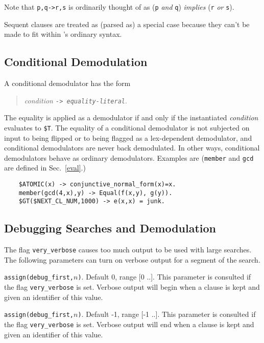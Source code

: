 \documentclass[11pt]{article}
\begin{document}
Note that \verb:p,q->r,s: is ordinarily thought of as
(\verb:p: {\em and} \verb:q:) {\em implies} 
(\verb:r: {\em or} \verb:s:).

Sequent clauses are treated as (parsed as) a special case because
they can't be made to fit within \otter's ordinary syntax.

\subsection{Conditional Demodulation} \label{cond-demod}

A conditional demodulator has the form
\begin{verse}
{\it condition \tt -> \it equality-literal}.
\end{verse}
The equality is applied as a demodulator if and only if the
instantiated {\it condition} evaluates to \verb:$T:.
The equality of
a conditional demodulator is not subjected on input to being flipped or
to being flagged as a lex-dependent demodulator, and conditional
demodulators are never back demodulated.  In other ways, conditional
demodulators behave as ordinary demodulators.  Examples are
(\verb:member: and \verb:gcd: are defined in Sec.~\ref{eval}.)

{\small
\begin{verbatim}
    $ATOMIC(x) -> conjunctive_normal_form(x)=x.
    member(gcd(4,x),y) -> Equal(f(x,y), g(y)).
    $GT($NEXT_CL_NUM,1000) -> e(x,x) = junk.
\end{verbatim}
}

\subsection{Debugging Searches and Demodulation}

The flag \verb:very_verbose: causes too much output to be used
with large searches.  The following parameters can turn on verbose
output for a segment of the search.

\noindent
\verb:assign(debug_first,:$n$\verb:):.  Default 0, range [0 ..\maxint ].
This parameter is consulted if the flag \verb:very_verbose:
is set.  Verbose output will begin when
a clause is kept and given an identifier of this value.

\noindent
\verb:assign(debug_first,:$n$\verb:):.  Default -1, range [-1 ..\maxint ].
This parameter is consulted if the flag \verb:very_verbose:
is set.  Verbose output will end when
a clause is kept and given an identifier of this value.
\end{document}
